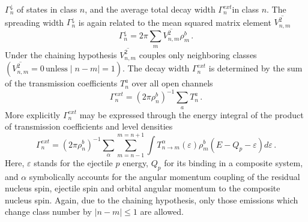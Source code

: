 \documentclass[twocolumn,amsmath,amssymb,10pt,groupedaddress,a4paper]{revtex4}
\begin{document}
$\Gamma_{n}^{\downarrow}$ of states in class $n$, and the average
total decay width $\Gamma_{n}^{ext}$in class $n$. The spreading
width $\Gamma_{n}^{\downarrow}$ is again related to the mean squared
matrix element $\overline{V_{n,m}^{2}}$
\begin{equation}
\Gamma_{n}^{\downarrow}=2\pi\sum_{m}\overline{V_{n,m}^{2}}\rho_{m}^{b}\,.
\label{GdownMSC}
\end{equation}
Under the chaining hypothesis $\overline{V_{n,m}^{2}}$ couples only
neighboring classes $(\overline{V_{n,m}^{2}}=0\,{\textrm{unless}}\mid n-m\mid=1)$.
The decay width $\Gamma_{n}^{ext}$ is determined by the sum of the
transmission coefficients $T_{n}^{a}$ over all open channels
\begin{equation}
\Gamma_{n}^{ext}=(2\pi\rho_{n}^{b})^{-1}\sum_{a}T_{n}^{a}\,.
\end{equation}
More explicitly $\Gamma_{n}^{ext}$ may be expressed through the energy
integral of the product of transmission coefficients and level densities
\begin{equation}
\Gamma_{n}^{ext}=(2\pi\rho_{n}^{b})^{-1}\sum_{\alpha}\sum_{m=n-1}^{m=n+1}\int T_{n\rightarrow m}^{\alpha}(\varepsilon)\rho_{m}^{b}(E-Q_{p}-\varepsilon)d\varepsilon\,.
\label{Gammext}
\end{equation}
Here, $\varepsilon$ stands for the ejectile $p$ energy, $Q_{p}$
for its binding in a composite system, and $\alpha$ symbolically
accounts for the angular momentum coupling of the residual nucleus
spin, ejectile spin and orbital angular momentum to the composite
nucleus spin. Again, due to the chaining hypothesis, only those emissions
which change class number by $\mid n-m\mid\leq1$ are allowed.
\end{document}
